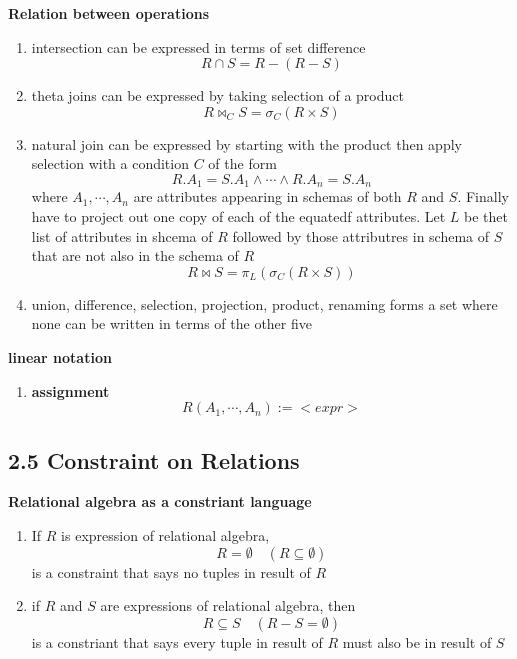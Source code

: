 \documentclass[11pt]{article}
\begin{document}
\begin{defn*}
    \textbf{Relation between operations}
    \begin{enumerate}
        \item intersection can be expressed in terms of set difference 
        \[
            R\cap S = R - (R - S)
        \]
        \item theta joins can be expressed by taking selection of a product 
        \[
            R \bowtie_C S = \sigma_C (R\times S)
        \]
        \item natural join can be expressed by starting with the product then apply selection with a condition $C$ of the form 
        \[
            R.A_1 = S.A_1 \land \cdots \land R.A_n = S.A_n
        \]
        where $A_1, \cdots, A_n$ are attributes appearing in schemas of both $R$ and $S$. Finally have to project out one copy of each of the equatedf attributes. Let $L$ be thet list of attributes in shcema of $R$ followed by those attributres in schema of $S$ that are not also in the schema of $R$
        \[
            R\bowtie S = \pi_L (\sigma_C (R\times S))
        \]
        \item union, difference, selection, projection, product, renaming forms a set where none can be written in terms of the other five
    \end{enumerate}
\end{defn*}


\begin{defn*}
    \textbf{linear notation} 
    \begin{enumerate}
        \item \textbf{assignment}
        \[
            R(A_1, \cdots, A_n) := <expr>
        \]
    \end{enumerate}
\end{defn*}


\subsection{2.5 Constraint on Relations}

\begin{defn*}
    \textbf{Relational algebra as a constriant language}
    \begin{enumerate}
        \item If $R$ is expression of relational algebra, 
        \[
            R = \emptyset \quad (R \subseteq \emptyset)
        \]
        is a constraint that says no tuples in result of $R$
        \item if $R$ and $S$ are expressions of relational algebra, then 
        \[
            R \subseteq S \quad (R - S = \emptyset)
        \]
        is a constriant that says every tuple in result of $R$ must also be in result of $S$
    \end{enumerate}
\end{defn*}
\end{document}
